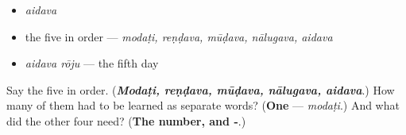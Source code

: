 \begin{itemize}
\raggedright
  \item \emph{aidava}
  \item the five in order — \emph{modaṭi, reṇḍava, mūḍava, nālugava, aidava}
  \item \emph{aidava rōju} — the fifth day
\end{itemize}

\begin{tcolorbox}[breakable,colback=teal!4,colframe=teal!35!black,title={Before you move on}]
Say the five in order. (\emph{\textbf{Modaṭi, reṇḍava, mūḍava, nālugava, aidava}}.) How many of them had to be learned as separate words? (\textbf{One} — \emph{modaṭi}.) And what did the other four need? (\textbf{The number, and -}.)
\end{tcolorbox}
